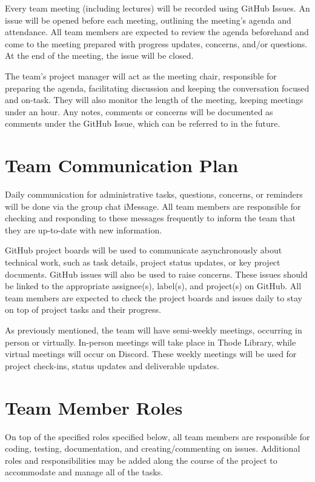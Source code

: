 \documentclass{article}
\begin{document}
	Every team meeting (including lectures) will be recorded using GitHub Issues. An issue will be opened before each meeting, outlining the meeting’s agenda and attendance. All team members are expected to review the agenda beforehand and come to the meeting prepared with progress updates, concerns, and/or questions. At the end of the meeting, the issue will be closed.

	The team’s project manager will act as the meeting chair, responsible for preparing the agenda, facilitating discussion and keeping the conversation focused and on-task. They will also monitor the length of the meeting, keeping meetings under an hour. Any notes, comments or concerns will be documented as comments under the GitHub Issue, which can be referred to in the future.

	\section{Team Communication Plan}

	Daily communication for administrative tasks, questions, concerns, or reminders will be done via the group chat iMessage. All team members are responsible for checking and responding to these messages frequently to inform the team that they are up-to-date with new information.

	GitHub project boards will be used to communicate asynchronously about technical work, such as task details, project status updates, or key project documents. GitHub issues will also be used to raise concerns. These issues should be linked to the appropriate assignee(s), label(s), and project(s) on GitHub. All team members are expected to check the project boards and issues daily to stay on top of project tasks and their progress.

	As previously mentioned, the team will have semi-weekly meetings, occurring in person or virtually. In-person meetings will take place in Thode Library, while virtual meetings will occur on Discord. These weekly meetings will be used for project check-ins, status updates and deliverable updates.

	\section{Team Member Roles}

	On top of the specified roles specified below, all team members are responsible for coding, testing, documentation, and creating/commenting on issues. Additional roles and responsibilities may be added along the course of the project to accommodate and manage all of the tasks.
\end{document}
